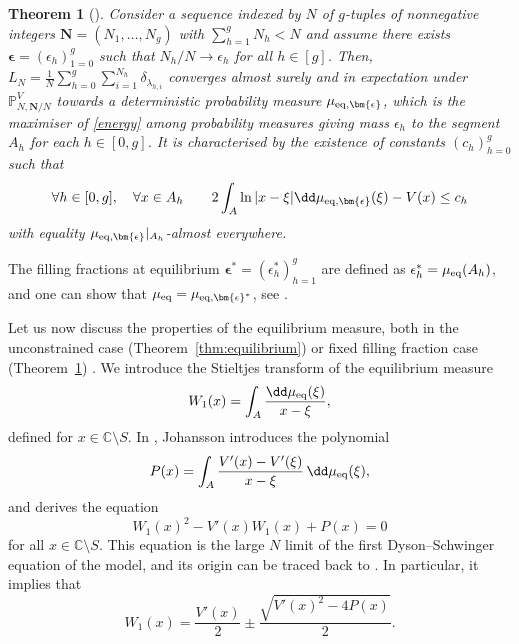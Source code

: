 \documentclass[10pt,a4paper]{amsart}
\numberwithin{equation}{section}
\newtheorem{Theorem}{Theorem}[section]
\newcommand{\C}{\mathbb{C}}
\begin{document}
\begin{Theorem}[{\cite[Theorem 1.2]{BGmulti}}]
 \label{mueqfixed} Consider a sequence indexed by $N$ of $g$-tuples of nonnegative
 integers $\bm{N} = (N_{1}, \ldots, N_{g})$ with $\sum_{h=1}^{g}N_{h} < N$ and
 assume there exists
 $\bm{\epsilon} = (\epsilon_{h})_{1 = 0}^{g}$ such that
 $N_{h}/N \to \epsilon_{h}$ for all $h \in [g]$.
 Then, $L_{N} = \frac{1}{N} \sum_{h = 0}^{g} \sum_{i=1}^{N_{h}}\delta_{\lambda_{h, i}}$
 converges almost surely and in expectation under $\mathbb{P}^{V}_{N,\bm{N}/N}$ towards a deterministic probability measure $\mu_{{\rm eq},\bm{\epsilon}}$, which is the maximiser of \eqref{energy} among probability measures giving mass $\epsilon_h$ to the segment $A_h$ for each $h \in [0,g]$. It is characterised by the existence of constants $(c_h)_{h = 0}^{g}$ such that
\[
\forall h \in [0,g], \quad \forall x \in A_h \qquad 2\int_{A}\ln|x - \xi|\dd\mu_{{\rm eq},\bm{\epsilon}}(\xi) - V(x) \leq c_h
\]
with equality $\mu_{{\rm eq},\bm{\epsilon}}|_{A_h}$-almost everywhere.
\end{Theorem}

The filling fractions at equilibrium
$\bm{\epsilon}^{*} = (\epsilon_{h}^{*})_{h=1}^{g}$ are defined as $\epsilon_{h}^{*} = \mu_{{\rm eq}}(A_h)$, and one can show that $\mu_{{\rm eq}} = \mu_{{\rm eq}, \bm{\epsilon}^{*}}$, see \cite[Section~1.4]{BGmulti}.

Let us now discuss the properties of the equilibrium measure, both in the unconstrained case (Theorem~\ref{thm:equilibrium}) or fixed filling fraction case (Theorem~\ref{mueqfixed}) . We introduce the Stieltjes transform of the equilibrium measure
\[
 W_{1}(x) = \int_{A}\frac{\dd \mu_{{\rm eq}}(\xi)}{x - \xi},
\]
defined for $x \in \C \setminus S$. In \cite{Johan}, Johansson introduces the polynomial
\[
 P(x) = \int_{A}\frac{V'(x) - V'(\xi)}{x - \xi}\,\dd \mu_{{\rm eq}}(\xi),
\]
and derives the equation
\begin{equation}\label{eq:variational}
 W_{1}(x)^{2} - V'(x)W_{1}(x) + P(x) = 0
\end{equation}
for all $x \in \C\setminus S$. This equation is the large $N$ limit of the first
Dyson--Schwinger equation of the model, and its origin can be traced back to
\cite{BIPZ,migdal_loop_1983}. In particular, it implies that
\begin{equation*}%
 W_{1}(x) = \frac{V'(x)}{2} \pm \frac{\sqrt{V'(x)^{2} - 4P(x)}}{2}.
\end{equation*}
\end{document}
